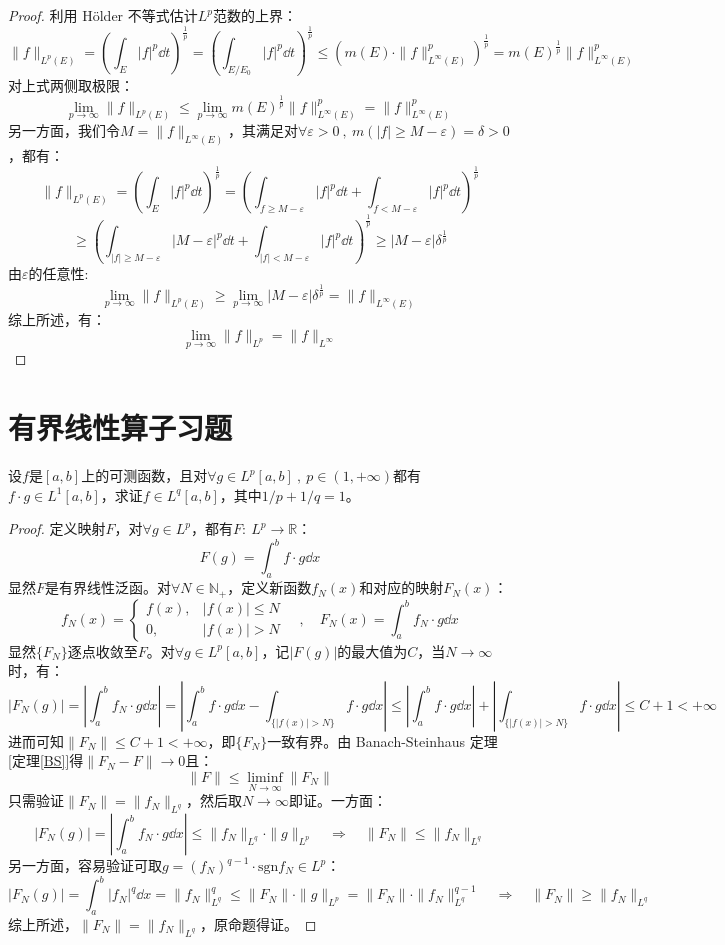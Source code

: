 \begin{proof}利用 H\"{o}lder 不等式估计$L^p$范数的上界：
\[\|f\|_{L^p(E)}=\left(\int_E|f|^p\dd t\right)^{\frac{1}{p}}=\left(\int_{E/E_0}|f|^p\dd t\right)^{\frac{1}{p}} \leq \left(m(E) \cdot \|f\|^p_{L^{\infty}(E)}\right)^{\frac{1}{p}}=m(E)^{\frac{1}{p}}\|f\|^p_{L^{\infty}(E)}\]
对上式两侧取极限：
\[\lim_{p \to \infty}\|f\|_{L^p(E)} \leq \lim_{p \to \infty}m(E)^{\frac{1}{p}}\|f\|^p_{L^{\infty}(E)}=\|f\|^p_{L^{\infty}(E)}\]
另一方面，我们令$M=\|f\|_{L^{\infty}(E)}$，其满足对$\forall \varepsilon>0 \ , \ m(|f| \geq M-\varepsilon)=\delta>0$，都有：
\[\|f\|_{L^p(E)}=\left(\int_E|f|^p\dd t\right)^{\frac{1}{p}}=\left(\int_{f \geq M-\varepsilon}|f|^p\dd t+\int_{f<M-\varepsilon}|f|^p\dd t\right)^{\frac{1}{p}}\]
\[\geq \left(\int_{|f| \geq M-\varepsilon}|M-\varepsilon|^p\dd t+\int_{|f|<M-\varepsilon}|f|^p\dd t\right)^{\frac{1}{p}} \geq |M-\varepsilon|\delta^{\frac{1}{p}}\]
由$\varepsilon$的任意性:
\[\lim_{p \to \infty}\|f\|_{L^p(E)} \geq \lim_{p \to \infty} |M-\varepsilon|\delta^{\frac{1}{p}}=\|f\|_{L^{\infty}(E)}\]
综上所述，有：
\[\lim_{p \to \infty}\|f\|_{L^p}=\|f\|_{L^{\infty}}\]
\end{proof}

\section*{有界线性算子习题}
\begin{example}
\quad 设$f$是$[a,b]$上的可测函数，且对$\forall g \in L^p[a,b] \ , \ p\in(1,+\infty)$都有$f \cdot g \in L^1[a,b]$，求证$f \in L^q[a,b]$，其中$1/p+1/q=1$。
\end{example}
\begin{proof}
定义映射$F$，对$\forall g \in L^p$，都有$F: \ L^p \to \mathbb{R}$：
\[F(g)=\int_a^bf \cdot g\dd{x}\]
显然$F$是有界线性泛函。对$\forall N \in \mathbb{N}_+$，定义新函数$f_N(x)$和对应的映射$F_N(x)$：
\[f_N(x)=\left\{\begin{array}{rl}
f(x), & |f(x)| \leq N \\ 0, & |f(x)|>N
\end{array}\right. \quad , \quad F_N(x)=\int_a^bf_N \cdot g \dd{x}\]
显然$\{F_N\}$逐点收敛至$F$。对$\forall g \in L^p[a,b]$，记$|F(g)|$的最大值为$C$，当$N \to \infty$时，有：
\[|F_N(g)|=\left|\int_a^b f_N \cdot g \dd{x}\right|=\left|\int_a^b f \cdot g \dd{x}-\int_{\{|f(x)|>N\}} f \cdot g \dd{x}\right|\leq\left|\int_a^b f \cdot g \dd{x}\right|+\left|\int_{\{|f(x)|>N\}} f \cdot g \dd{x}\right| \leq C+1<+\infty\]
进而可知$\|F_N\|\leq C+1<+\infty$，即$\{F_N\}$一致有界。由 Banach-Steinhaus 定理[定理\ref{BS}]得$\|F_N-F\| \to 0$且：
\[\|F\|\leq \liminf_{N\to\infty}\|F_N\|\]
只需验证$\|F_N\|=\|f_N\|_{L^q}$，然后取$N \to \infty$即证。一方面：
\[|F_N(g)|=\left|\int_a^b f_N \cdot g \dd{x}\right|\leq\|f_N\|_{L^q}\cdot\|g\|_{L^p} \quad \Rightarrow \quad \|F_N\| \leq \|f_N\|_{L^q}\]
另一方面，容易验证可取$g=(f_N)^{q-1}\cdot\text{sgn}f_N \in L^p$：
\[|F_N(g)|=\int_a^b |f_N|^q \dd{x}=\|f_N\|^q_{L^q} \leq \|F_N\|\cdot\|g\|_{L^p}=\|F_N\|\cdot\|f_N\|^{q-1}_{L^q} \quad \Rightarrow \quad \|F_N\| \geq \|f_N\|_{L^q}\]
综上所述，$\|F_N\|=\|f_N\|_{L^q}$，原命题得证。
\end{proof}
\newpage

